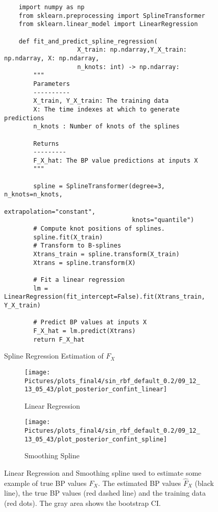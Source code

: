 %
\begin{figure}[!htb]
\centering

\begin{verbatim}
    import numpy as np
    from sklearn.preprocessing import SplineTransformer
    from sklearn.linear_model import LinearRegression

    def fit_and_predict_spline_regression(
                    X_train: np.ndarray,Y_X_train: np.ndarray, X: np.ndarray,
                    n_knots: int) -> np.ndarray:
        """
        Parameters
        ----------
        X_train, Y_X_train: The training data
        X: The time indexes at which to generate predictions
        n_knots : Number of knots of the splines

        Returns
        ---------
        F_X_hat: The BP value predictions at inputs X
        """

        spline = SplineTransformer(degree=3, n_knots=n_knots,
                                   extrapolation="constant",
                                   knots="quantile")
        # Compute knot positions of splines.
        spline.fit(X_train)
        # Transform to B-splines
        Xtrans_train = spline.transform(X_train)
        Xtrans = spline.transform(X)

        # Fit a linear regression
        lm = LinearRegression(fit_intercept=False).fit(Xtrans_train, Y_X_train)

        # Predict BP values at inputs X
        F_X_hat = lm.predict(Xtrans)
        return F_X_hat

\end{verbatim}
\caption{Spline Regression Estimation of $F_X$}
\label{code:smoothing-spline}
\end{figure}



\begin{figure}[!htb]
\centering
\begin{subfigure}{.5\textwidth}
    \centering
    \texttt{[image: 
        Pictures/plots\_final4/sin\_rbf\_default\_0.2/09\_12\_13\_05\_43/plot\_posterior\_confint\_linear]}
    \caption{Linear Regression}
    \label{fig:post-linear}
\end{subfigure}\hfill
\begin{subfigure}{.5\textwidth}
    \centering
    \texttt{[image: 
        Pictures/plots\_final4/sin\_rbf\_default\_0.2/09\_12\_13\_05\_43/plot\_posterior\_confint\_spline]}
    \caption{Smoothing Spline}
    \label{fig:post-spline}
\end{subfigure}
\caption{Linear Regression and Smoothing spline used
to estimate some example of true BP values $F_X$. The estimated BP values $\hat{F}_X$ (black line), the
        true BP values (red dashed line) and the training data (red dots). The gray area shows
the bootstrap CI.}
\label{fig:regression-example}
\end{figure}


